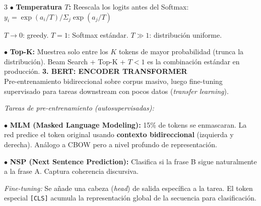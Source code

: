 \documentclass[8pt,a4paper,landscape,fleqn]{extarticle}
\begin{document}
\begin{multicols*}{3}
$\bullet$ \textbf{Temperatura $T$:} Reescala los logits antes del Softmax: $y_i = \exp(a_i/T)/\Sigma_j \exp(a_j/T)$ 

$T{\to}0$: greedy. $T{=}1$: Softmax estándar. $T{\gg}1$: distribución uniforme.
 
$\bullet$ \textbf{Top-K:} Muestrea solo entre los $K$ tokens de mayor probabilidad (trunca la distribución). Beam Search + Top-K + $T<1$ es la combinación estándar en producción.
\textbf{3. BERT: ENCODER TRANSFORMER}\\
Pre-entrenamiento bidireccional sobre corpus masivo, luego fine-tuning supervisado para tareas downstream con pocos datos (\textit{transfer learning}).
 
\textit{Tareas de pre-entrenamiento (autosupervisadas):}
 
$\bullet$ \textbf{MLM (Masked Language Modeling):} 15\% de tokens se enmascaran. La red predice el token original usando \textbf{contexto bidireccional} (izquierda y derecha). Análogo a CBOW pero a nivel profundo de representación.
 
$\bullet$ \textbf{NSP (Next Sentence Prediction):} Clasifica si la frase B sigue naturalmente a la frase A. Captura coherencia discursiva.
 
\textit{Fine-tuning:} Se añade una cabeza (\textit{head}) de salida específica a la tarea. El token especial \texttt{[CLS]} acumula la representación global de la secuencia para clasificación.
\begin{center}
\end{center}
\end{multicols*}
\end{document}
